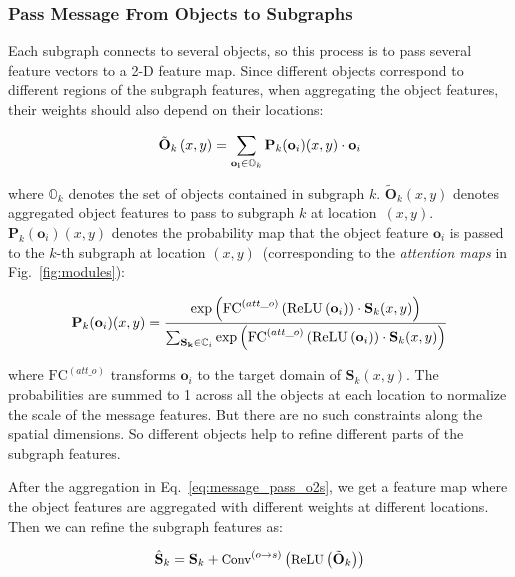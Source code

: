 \documentclass[runningheads]{llncs}
\begin{document}
\subsubsection{Pass Message From Objects to Subgraphs}
Each subgraph connects to several objects, so this process is to pass several feature vectors to a 2-D feature map. Since different objects correspond to different regions of the subgraph features, when aggregating the object features, their weights should also depend on their locations:

\begin{equation}\small
\tilde{\mathbf{O}}_k\left(x,y\right)=\sum_{\mathbf{o_i}\in \mathbb{O}_k} \mathbf{P}_k(\mathbf{o}_i)( x, y) \cdot \mathbf{o}_i
\label{eq:message_pass_o2s}
\end{equation}

\noindent where $\mathbb{O}_k$ denotes the set of objects contained in subgraph $k$. $\tilde{\mathbf{O}}_k\left(x,y\right)$ denotes aggregated object features to pass to subgraph $k$ at location~$\left(x,y\right)$. $\mathbf{P}_k(\mathbf{o}_i)(x,y)$ denotes the probability map that the object feature $\mathbf{o}_i$ is passed to the $k$-th subgraph at location $(x,y)$~(corresponding to the \emph{attention maps} in Fig.~\ref{fig:modules}):

\begin{equation}\small
\mathbf{P}_k(\mathbf{o}_i)(x,y)=\frac{\exp{\left(\mathrm{FC}^{(att\_o)}\left(\mathrm{ReLU}\left(\mathbf{o}_i\right)\right) \cdot \mathbf{S}_k(x,y)\right)}}{
		\sum_{\mathbf{S_k}\in \mathbb{C}_i} 
			\exp{\left(\mathrm{FC}^{(att\_o)}\left(\mathrm{ReLU}\left(\mathbf{o}_i\right)\right) \cdot \mathbf{S}_k(x,y)\right)}}
\label{eq:message_pass_o2s_p}
\end{equation}

\noindent where $\mathrm{FC}^{(att\_o)}$ transforms $\mathbf{o}_i$ to the target domain of $\mathbf{S}_k(x,y)$. 
The probabilities are summed to 1 across all the objects at each location to normalize the scale of the message features. But there are no such constraints along the spatial dimensions. So different objects help to refine different parts of the subgraph features. 

After the aggregation in Eq.~\ref{eq:message_pass_o2s}, we get a feature map where the object features are aggregated with different weights at different locations. Then we can refine the subgraph features as:

\begin{equation}\small
\hat{\mathbf{S}}_k=\mathbf{S}_k + \textrm{Conv}^{(o\rightarrow s)}\left(\textrm{ReLU}\left(\tilde{\mathbf{O}}_k\right)\right)
\label{eq:message_pass_o2s_refine}
\end{equation}
\end{document}
